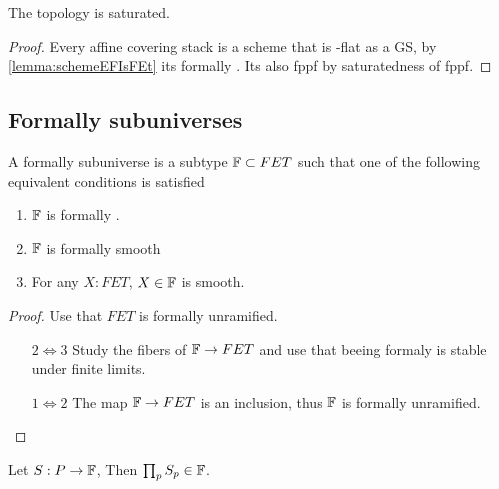 \begin{corollary}
	The \etale topology is saturated.
\end{corollary}
\begin{proof}
	Every affine covering stack is a scheme that is \etale-flat as a GS, by \ref{lemma:schemeEFIsFEt} its formally \etale. Its also fppf by saturatedness of fppf.
\end{proof}
\subsection{Formally \etale subuniverses}
\begin{definition}{\label{lemma:FisFet}}
	A formally \etale subuniverse is a subtype $\mathbb{F} \subset FET$ such that one of the following equivalent conditions is satisfied
	\begin{enumerate}
		\item  $\mathbb{F}$ is formally \etale.
		\item $\mathbb{F}$ is formally smooth
		\item For any $X : FET$, $X \in \mathbb{F}$ is smooth.
	\end{enumerate}
\end{definition}
\begin{proof}
	Use that 	$FET$ is formally unramified.
	\begin{enumerate}
		\item [$2 \Leftrightarrow 3$] Study the fibers of $\mathbb{F} \to FET$ and use that beeing formaly \etale is stable under finite limits.
		\item [$1 \Leftrightarrow 2$]  The map $\mathbb{F} \to FET$ is an inclusion, thus $\mathbb{F}$ is formally unramified.
	\end{enumerate}
	
\end{proof}


\begin{lemma}{\label{cor:SubUnivDepProdStable}}
	Let $S : P \to \mathbb{F}$, Then $\prod_p S_p \in \mathsf{\mathbb{F}}$.
\end{lemma}

